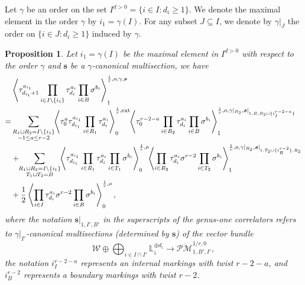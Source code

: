 \documentclass[11pt]{amsart}
\newtheorem{prop}[dummy]{Proposition}
\theoremstyle{definition}
\theoremstyle{remark}
\newcommand{\consta}{{\frac{1}{2}}}
\newcommand{\oPMb}{{\overline{\mathcal{PM}}}}
\newcommand{\<}{\left<}
\renewcommand{\>}{\right>}
\numberwithin{equation}{section}
\begin{document}
Let $\gamma$ be an order on the set $I^{d>0}=\{i\in I\colon d_i\ge 1\}$. We denote the maximal element in the order $\gamma$ by $i_1=\gamma(I)$. For any subset $J\subseteq I$, we denote by $\gamma\vert_J$ the order on $\{i\in J\colon d_i\ge 1\}$ induced by $\gamma$.
\begin{prop}\label{prop trr g=1 ordered}
Let $i_1=\gamma(I)$ be the maximal element in $I^{d>0}$ with respect to the order $\gamma$ and $\mathbf{s}$ be a $\gamma$-canonical multisection, we have
\begin{equation}\label{eq trr g=1 ordered}
\begin{split}
&\left\langle \tau_{d_{i_1}+1}^{a_{i_1}}\prod_{i\in I\setminus \{i_1\}}\tau^{a_i}_{d_i}\prod_{i\in B}\sigma^{b_i}\right\rangle^{\frac{1}{r},o,\gamma,\bm{s}}_1\hspace{-0.2cm}\\
=&\sum_{\substack{R_1 \sqcup R_2 = I\setminus\{i_1\}\\ -1\le a \le r-2}}\hspace{-0.1cm}\left\langle \tau_0^{a}\tau_{d_{i_1}}^{a_{i_1}}\prod_{i \in R_1}\tau_{d_i}^{a_i}\right\rangle^{\frac{1}{r},\text{ext}}_0
\hspace{-0.1cm}\left\langle \tau_0^{r-2-a}\prod_{i\in R_2}\tau^{a_i}_{d_i}\prod_{i\in B}\sigma^{b_i}\right\rangle^{\frac{1}{r},o,\gamma\vert_{R_2},\bm{s}\vert_{1,B,R_2\sqcup\{i^{r-2-a}_I\}}}_1\\
&+\hspace{-0.1cm}\sum_{\substack{R_1 \sqcup R_2 =  I\setminus\{i_1\} \\ T_1 \sqcup T_2 =  B}} \hspace{-0.1cm} \left\langle \tau^{a_{i_1}}_{d_{i_1}}\prod_{i \in R_1} \tau^{a_i}_{d_i}\prod_{i\in T_1}\sigma^{b_i}\right\rangle^{\frac{1}{r},o}_0 \hspace{-0.1cm}\left\langle \prod_{i \in R_2} \tau^{a_i}_{d_i} \sigma^{r-2}\prod_{i\in T_2}\sigma^{b_i}\right\rangle^{\frac{1}{r}, o,\gamma\vert_{R_2},\bm{s}\vert_{1,T_2\sqcup\{i^{r-2}_B\},R_2}}_1\\
&+\consta\left\langle \prod_{i\in I}\tau^{a_i}_{d_i}\sigma^{r-2}\prod_{i\in B}\sigma^{b_i}\right\rangle^{\frac{1}{r},o}_0,
    \end{split}
\end{equation}   
where the notation $\bm{s}\vert_{1,I',B'}$ in the superscripts of the genus-one correlators refers to $\gamma\vert_{I'}$-canonical multisections (determined by $\bm{s}$) of the vector bundle
$$\mathcal W\oplus \bigoplus_{i\in I\cap I'} \mathbb L_i^{\oplus d_i}\to \oPMb^{1/r,0}_{1,B',I'},$$
the notation $i^{r-2-a}_I$ represents an internal markings with twist $r-2-a$, and $i^{r-2}_B$ represents a boundary markings with twist $r-2$.

\end{prop}
\end{document}
